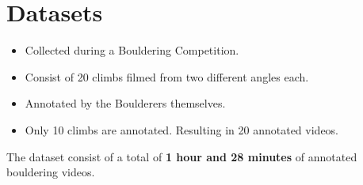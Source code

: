 \section{Datasets}

\begin{frame}

    \vspace{1em}

    \begin{itemize}
        \itemsep1em
        \item Collected during a Bouldering Competition.
        \item Consist of 20 climbs filmed from two different angles each.
        \item Annotated by the Boulderers themselves.
        \item Only 10 climbs are annotated. Resulting in 20 annotated videos.
    \end{itemize}

    \vspace{1em}
    
    The dataset consist of a total of \textbf{1 hour and 28 minutes} of annotated bouldering videos.
\end{frame}


